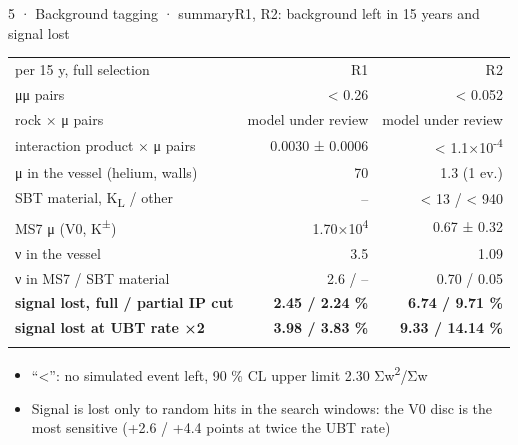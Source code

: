 \begin{btframe}{5 · Background tagging · summary}{R1, R2: background left in 15 years and signal lost}
{\fontsize{5.31pt}{6.90pt}\selectfont\setlength{\tabcolsep}{3.72pt}\renewcommand{\arraystretch}{1.42}
\begin{tabularx}{\linewidth}{>{\raggedright\arraybackslash}Xrr}
\textcolor{muted}{per 15 y, full selection} & \textcolor{muted}{R1} & \textcolor{muted}{R2} \\\headrule
μμ pairs & < 0.26 & < 0.052 \\\rowrule
rock × μ pairs & \textcolor{muted}{model under review} & \textcolor{muted}{model under review} \\\rowrule
interaction product × μ pairs & 0.0030 ± 0.0006 & < 1.1×10\textsuperscript{-4} \\\rowrule
μ in the vessel (helium, walls) & 70 & 1.3 (1 ev.) \\\rowrule
SBT material, K\textsubscript{L} / other & – & < 13 / < 940 \\\rowrule
MS7 μ (V0, K\textsuperscript{±}) & 1.70×10\textsuperscript{4} & 0.67 ± 0.32 \\\rowrule
ν in the vessel & 3.5 & 1.09 \\\rowrule
ν in MS7 / SBT material & 2.6 / – & 0.70 / 0.05 \\\rowrule
\rowcolor{tint}\bfseries signal lost, full / partial IP cut & \bfseries 2.45 / 2.24 \% & \bfseries 6.74 / 9.71 \% \\\rowrule
\rowcolor{tint}\bfseries signal lost at UBT rate ×2 & \bfseries 3.98 / 3.83 \% & \bfseries 9.33 / 14.14 \% \\\rowrule
\end{tabularx}\par}
\vspace{2.46pt}
{\fontsize{6.15pt}{8.60pt}\selectfont
\begin{itemize}
  \item “<”: no simulated event left, 90 \% CL upper limit 2.30 Σw\textsuperscript{2}/Σw
  \item Signal is lost only to random hits in the search windows: the V0 disc is the most sensitive (+2.6 / +4.4 points at twice the UBT rate)
\end{itemize}}
\end{btframe}
